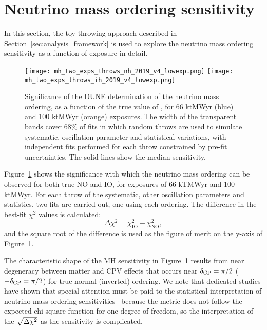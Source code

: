 \section{Neutrino mass ordering sensitivity}
\label{sec:mh_sens}

In this section, the toy throwing approach described in Section~\ref{sec:analysis_framework} is used to explore the neutrino mass ordering sensitivity as a function of exposure in detail.

\begin{figure}[htbp]
  \centering
  \texttt{[image: mh\_two\_exps\_throws\_nh\_2019\_v4\_lowexp.png]}
  \texttt{[image: mh\_two\_exps\_throws\_ih\_2019\_v4\_lowexp.png]}
  \caption{Significance of the DUNE determination of the neutrino mass ordering, as a function of the true value of \deltacp, for 66 ktMWyr (blue) and 100 ktMWyr (orange) exposures. The width of the transparent bands cover 68\% of fits in which random throws are used to simulate systematic, oscillation parameter and statistical variations, with independent fits performed for each throw constrained by pre-fit uncertainties. The solid lines show the median sensitivity.}
  \label{fig:mh_bands}
\end{figure}
Figure~\ref{fig:mh_bands} shows the significance with which the neutrino mass ordering can be observed for both true NO and IO, for exposures of 66 kTMWyr and 100 ktMWyr. For each throw of the systematic, other oscillation parameters and statistics, two fits are carried out, one using each ordering. The difference in the best-fit $\chi^{2}$ values is calculated:
\begin{equation}
  \Delta\chi^{2} = \chi^{2}_{\mathrm{IO}} - \chi^{2}_{\mathrm{NO}},
  \label{eq:mh_chi2}
\end{equation}
\noindent and the square root of the difference is used as the figure of merit on the y-axis of Figure~\ref{fig:mh_bands}.

The characteristic shape of the MH sensitivity in Figure~\ref{fig:mh_bands} results from near degeneracy between matter and CPV effects that occurs near $\delta_{\rm CP}=\pi/2$ ($-\delta_{\rm CP}=\pi/2$) for true normal (inverted) ordering. We note that dedicated studies have shown that special attention must be paid to the statistical interpretation of neutrino mass ordering sensitivities~\cite{Ciuffoli:2013rza,Qian:2012zn,Blennow:2013oma} because the \dchisq metric does not follow the expected chi-square function for one degree of freedom, so the interpretation of the $\sqrt{\Delta\chi^{2}}$ as the sensitivity is complicated.

